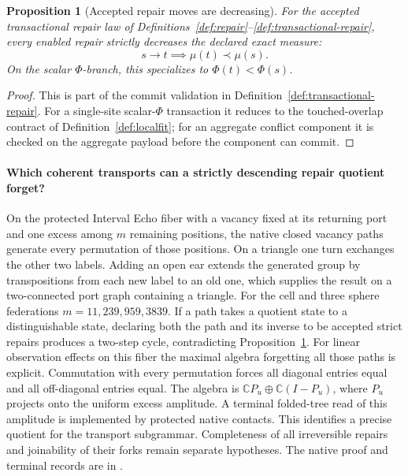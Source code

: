 \documentclass[11pt]{article}
\newtheorem{proposition}[theorem]{Proposition}
\theoremstyle{remark}
\theoremstyle{plain}
\begin{document}
\begin{proposition}[Accepted repair moves are decreasing]\label{prop:lyapunov-descent}
For the accepted transactional repair law of
Definitions~\ref{def:repair}--\ref{def:transactional-repair}, every enabled repair strictly
decreases the declared exact measure:
\[
s\to t \implies \mu(t)\prec\mu(s).
\]
On the scalar \(\Phi\)-branch, this specializes to \(\Phi(t)<\Phi(s)\).
\end{proposition}

\begin{proof}
This is part of the commit validation in Definition~\ref{def:transactional-repair}. For a
single-site scalar-\(\Phi\) transaction it reduces to the touched-overlap contract of
Definition~\ref{def:localfit}; for an aggregate conflict component it is checked on the aggregate
payload before the component can commit.
\end{proof}

\paragraph{Which coherent transports can a strictly descending repair
quotient forget?}
On the protected Interval Echo fiber with a vacancy fixed at its returning
port and one excess among \(m\) remaining positions, the native closed
vacancy paths generate every permutation of those positions. On a triangle
one turn exchanges the other two labels. Adding an open ear extends the
generated group by transpositions from each new label to an old one, which
supplies the result on a two-connected port graph containing a triangle.
For the cell and three sphere federations \(m=11,239,959,3839\).
If a path takes a quotient state to a distinguishable state, declaring both
the path and its inverse to be accepted strict repairs produces a
two-step cycle, contradicting Proposition~\ref{prop:lyapunov-descent}.
For linear observation effects on this fiber the maximal algebra forgetting
all those paths is explicit. Commutation with every permutation forces
all diagonal entries equal and all off-diagonal entries equal. The algebra
is \(\mathbb C P_u\oplus\mathbb C(I-P_u)\), where \(P_u\) projects onto the
uniform excess amplitude. A terminal folded-tree read of this amplitude is
implemented by protected native contacts. This identifies a precise
quotient for the transport subgrammar. Completeness of all irreversible
repairs and joinability of their forks remain separate hypotheses.
The native proof and terminal records are in
.
\end{document}
